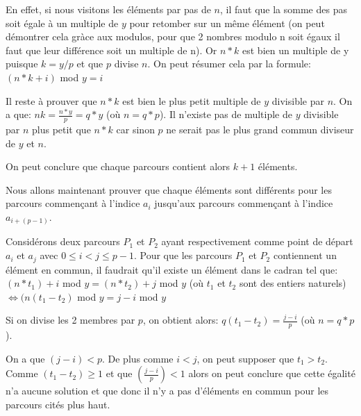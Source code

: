 \documentclass[a4paper, 12pt]{report}
\begin{document}
En effet, si nous visitons les éléments par pas de $n$, il faut que la somme des pas soit égale à un multiple de $y$ pour retomber sur un même élément (on peut démontrer cela gràce aux modulos, pour que 2 nombres modulo n soit égaux il faut que leur différence soit un multiple de n). Or $n*k$ est bien un multiple de y puisque $k = y/p$ et que $p$ divise $n$. On peut résumer cela par la formule:\newline
$(n*k+i)$ mod $y = i$ \newline

Il reste à prouver que $n*k$ est bien le plus petit multiple de $y$ divisible par $n$. On a que:\newline
$nk = \frac{n*y}{p} = q*y$ (où $n=q*p$).\newline
Il n'existe pas de multiple de $y$ divisible par $n$ plus petit que $n*k$ car sinon $p$ ne serait pas le plus grand commun diviseur de $y$ et $n$.\newline

On peut conclure que chaque parcours contient alors $k+1$ éléments. \newline

Nous allons maintenant prouver que chaque éléments sont différents pour les parcours commençant à l'indice $a_{i}$ jusqu'aux parcours commençant à l'indice $a_{i+(p-1)}$.\newline

Considérons deux parcours $P_{1}$ et $P_{2}$ ayant respectivement comme point de départ $a_{i}$ et $a_{j}$ avec $0 \leq i < j \leq p-1$. Pour que les parcours $P_{1}$ et $P_{2}$ contiennent un élément en commun, il faudrait qu'il existe un élément dans le cadran tel que:\newline
$(n*t_{1})+i$ mod $y = (n*t_{2})+j$ mod $y$  (où $t_{1}$ et $t_{2}$ sont des entiers naturels)\newline
$\Leftrightarrow (n(t_{1} - t_{2})$ mod $y = j-i$ mod $y$ \newline

Si on divise les 2 membres par $p$, on obtient alors:\newline
$q(t_{1} - t_{2}) = \frac{j-i}{p}$  (où $n=q*p$).\newline

On a que $(j-i) < p$. De plus comme $i < j$, on peut supposer que $t_{1} > t_{2}$. Comme $(t_{1}-t_{2}) \geq 1$ et que $(\frac{j-i}{p}) < 1$ alors on peut conclure que cette égalité n'a aucune solution et que donc il n'y a pas d'éléments en commun pour les parcours cités plus haut.\newline
\end{document}
